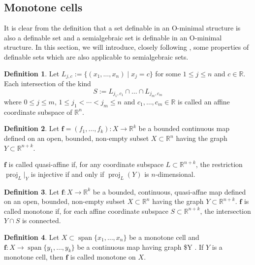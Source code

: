 \documentclass[
]{book}
\theoremstyle{definition}
\newtheorem{definition}{Definition}[chapter]
\theoremstyle{definition}
\theoremstyle{definition}
\theoremstyle{definition}
\theoremstyle{remark}
\begin{document}
\hypertarget{monotone-cells}{%
\subsection{Monotone cells}\label{monotone-cells}}

It is clear from the definition that a set definable in an O-minimal structure is also a definable set and a semialgebraic set is definable in an O-minimal structure. In this section, we will introduce, closely following \citet{bgv15}, some properties of definable sets which are also applicable to semialgebraic sets.

\begin{definition}
\protect\hypertarget{def:affine-coordinate-subspace}{}\label{def:affine-coordinate-subspace}\citep[Definition 2.1]{bgv15}
Let \(L_{j,c} := \{ (x_1,\ldots,x_n) \mid x_j = c \}\) for some \(1 \le j \le n\) and \(c \in \mathbb{R}\).
Each intersection of the kind
\[
S := L_{j_1,c_1} \cap \ldots \cap L_{j_m,c_m}
\]
where \(0 \le j \le m\), \(1 \le j_1 < \cdots < j_m \le n\) and \(c_1,\ldots,c_m \in \mathbb{R}\) is called an affine coordinate subspace of \(\mathbb{R}^n\).
\end{definition}

\begin{definition}
\citep[Definition 2.2]{bgv15}
Let \(\mathbf{f} = (f_1,\ldots,f_k) : X \to \mathbb{R}^k\) be a bounded continuous map defined on an open, bounded, non-empty subset \(X \subset \mathbb{R}^n\) having the graph \(Y \subset \mathbb{R}^{n+k}\).

\(\mathbf{f}\) is called quasi-affine if, for any coordinate subspace \(L \subset \mathbb{R}^{n+k}\), the restriction \(\operatorname{proj}_{L}\vert_Y\) is injective if and only if \(\operatorname{proj}_{L}(Y)\) is \(n\)-dimensional.
\end{definition}

\begin{definition}
\protect\hypertarget{def:monotone-map}{}\label{def:monotone-map}\citep[Definition 2.3]{bgv15}
Let \(\mathbf{f} : X \to \mathbb{R}^k\) be a bounded, continuous, quasi-affne map defined on an open, bounded, non-empty subset \(X\subset \mathbb{R}^n\) having the graph \(Y \subset \mathbb{R}^{n+k}\). \(\mathbf{f}\) is called monotone if, for each affine coordinate subspace \(S \subset \mathbb{R}^{n+k}\), the intersection \(Y \cap S\) is connected.
\end{definition}

\begin{definition}
\protect\hypertarget{def:monotone-map-on}{}\label{def:monotone-map-on}\citep[Definition 2.10]{bgv15}
Let \(X \subset {\operatorname{span} \{x_1,\ldots,x_n\}}\) be a monotone cell and \(\mathbf{f} : X \to {\operatorname{span} \{y_1,\ldots,y_k\}}\) be a continuous map having graph \$Y \subset . If \(Y\) is a monotone cell, then \(\mathbf{f}\) is called monotone on \(X\).
\end{definition}
\end{document}
